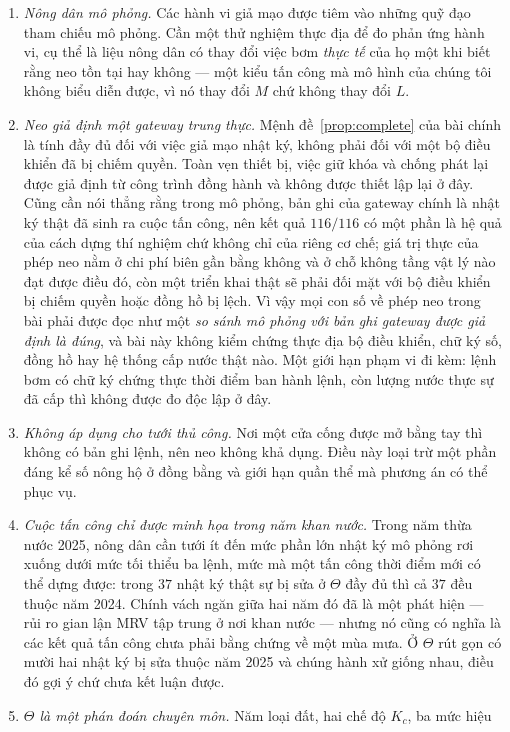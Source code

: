 \begin{enumerate}
\item \emph{Nông dân mô phỏng.} Các hành vi giả mạo được tiêm vào những quỹ đạo tham chiếu mô
phỏng. Cần một thử nghiệm thực địa để đo phản ứng hành vi, cụ thể là liệu nông dân có thay
đổi việc bơm \emph{thực tế} của họ một khi biết rằng neo tồn tại hay không --- một kiểu tấn
công mà mô hình của chúng tôi không biểu diễn được, vì nó thay đổi $M$ chứ không thay đổi $L$.
\item \emph{Neo giả định một gateway trung thực.} Mệnh đề~\ref{prop:complete} của bài chính là
tính đầy đủ đối với việc giả mạo nhật ký, không phải đối với một bộ điều khiển đã bị chiếm
quyền. Toàn vẹn thiết bị, việc giữ khóa và chống phát lại được giả định từ công trình đồng
hành và không được thiết lập lại ở đây. Cũng cần nói thẳng rằng trong mô phỏng, bản ghi của
gateway chính là nhật ký thật đã sinh ra cuộc tấn công, nên kết quả $116/116$ có một phần là
hệ quả của cách dựng thí nghiệm chứ không chỉ của riêng cơ chế; giá trị thực của phép neo nằm
ở chi phí biên gần bằng không và ở chỗ không tầng vật lý nào đạt được điều đó, còn một triển khai thật sẽ phải đối mặt với bộ điều khiển bị chiếm quyền hoặc đồng hồ bị lệch. Vì vậy mọi con số về phép neo trong bài phải được đọc như một \emph{so sánh mô phỏng với bản ghi gateway được giả định là đúng}, và bài này không kiểm chứng thực địa bộ điều khiển, chữ ký số, đồng hồ hay hệ thống cấp nước thật nào. Một giới hạn phạm vi đi kèm: lệnh bơm có chữ ký chứng thực thời điểm ban hành lệnh, còn lượng nước thực sự đã cấp thì không được đo độc lập ở đây.
\item \emph{Không áp dụng cho tưới thủ công.} Nơi một cửa cống được mở bằng tay thì không có
bản ghi lệnh, nên neo không khả dụng. Điều này loại trừ một phần đáng kể số nông hộ ở đồng
bằng và giới hạn quần thể mà phương án có thể phục vụ.
\item \emph{Cuộc tấn công chỉ được minh họa trong năm khan nước.} Trong năm thừa nước 2025,
nông dân cần tưới ít đến mức phần lớn nhật ký mô phỏng rơi xuống dưới mức tối thiểu ba lệnh,
mức mà một tấn công thời điểm mới có thể dựng được: trong $37$ nhật ký thật sự bị sửa ở
$\Theta$ đầy đủ thì cả $37$ đều thuộc năm 2024. Chính vách ngăn giữa hai năm đó đã là một
phát hiện --- rủi ro gian lận MRV tập trung ở nơi khan nước --- nhưng nó cũng có nghĩa là các
kết quả tấn công chưa phải bằng chứng về một mùa mưa. Ở $\Theta$ rút gọn có mười hai nhật ký
bị sửa thuộc năm 2025 và chúng hành xử giống nhau, điều đó gợi ý chứ chưa kết luận được.
\item \emph{$\Theta$ là một phán đoán chuyên môn.} Năm loại đất, hai chế độ $K_c$, ba mức hiệu

\end{enumerate}
